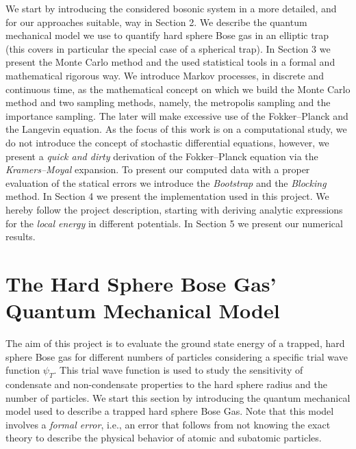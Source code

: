 \documentclass[11pt,a4paper]{article}
\numberwithin{equation}{section}
\begin{document}
%
We start by introducing the considered bosonic system in a more detailed, and for our approaches suitable, way in Section 2. 
%
We describe the quantum mechanical model we use to quantify hard sphere Bose gas in an elliptic trap (this covers in particular the special case of a spherical trap). 
%
In Section 3 we present the Monte Carlo method and the used statistical tools in a formal and mathematical rigorous way.
%
We introduce Markov processes, in discrete and continuous time, as the mathematical concept on which we build the Monte Carlo method and two sampling methods, namely, the metropolis sampling and the importance sampling. 
%
The later will make excessive use of the Fokker--Planck and the Langevin equation. 
%
As the focus of this work is on a computational study, we do not introduce the concept of stochastic differential equations, however, we present a {\it quick and dirty} derivation of the Fokker--Planck equation via the {\it Kramers--Moyal} expansion.
%
To present our computed data with a proper evaluation of the statical errors we introduce the {\it Bootstrap} and the {\it Blocking} method.
%
In Section 4 we present the implementation used in this project. 
%
We hereby follow the project description, starting with deriving analytic expressions for the {\it local energy} in different potentials.
%
In Section 5 we present our numerical results. 


\section{The Hard Sphere Bose Gas' Quantum Mechanical Model} 
%
The aim of this project is to evaluate the ground state energy of a trapped, hard sphere Bose gas for different numbers of particles considering a specific trial wave function $\psi_T$.
%
This trial wave function is used to study the sensitivity of condensate and non-condensate properties to the hard sphere radius and the number of particles.  
%
We start this section by introducing the quantum mechanical model used to describe a trapped hard sphere Bose Gas.
%
Note that this model involves a {\it formal error}, i.e., an error that follows from not knowing the exact theory to describe the physical behavior of atomic and subatomic particles. 
%
  
\end{document}
